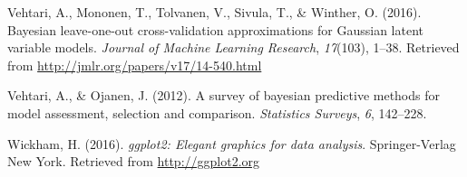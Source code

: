 \documentclass[english,,doc,floatsintext]{apa6}
\theoremstyle{definition}
\theoremstyle{definition}
\theoremstyle{definition}
\theoremstyle{remark}
\begin{document}
\leavevmode\hypertarget{ref-vehtari2016}{}%
Vehtari, A., Mononen, T., Tolvanen, V., Sivula, T., \& Winther, O.
(2016). Bayesian leave-one-out cross-validation approximations for
Gaussian latent variable models. \emph{Journal of Machine Learning
Research}, \emph{17}(103), 1--38. Retrieved from
\url{http://jmlr.org/papers/v17/14-540.html}

\leavevmode\hypertarget{ref-vehtari2012}{}%
Vehtari, A., \& Ojanen, J. (2012). A survey of bayesian predictive
methods for model assessment, selection and comparison. \emph{Statistics
Surveys}, \emph{6}, 142--228.

\leavevmode\hypertarget{ref-ggplot2}{}%
Wickham, H. (2016). \emph{ggplot2: Elegant graphics for data analysis}.
Springer-Verlag New York. Retrieved from \url{http://ggplot2.org}
\end{document}
